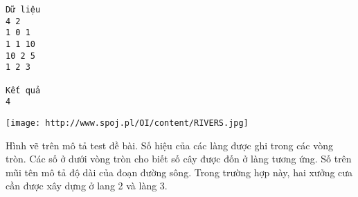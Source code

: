 \begin{verbatim}
Dữ liệu
4 2
1 0 1
1 1 10
10 2 5
1 2 3

Kết quả
4
\end{verbatim}
\texttt{[image: http://www.spoj.pl/OI/content/RIVERS.jpg]}

   Hình vẽ trên mô tả test đề bài. Số hiệu của các làng được ghi trong các vòng tròn. Các số ở dưới vòng tròn cho biết số cây được đốn ở làng tương ứng. Số trên mũi tên mô tả độ dài của đoạn đường sông. Trong trường hợp này, hai xưởng cưa cần được xây dựng ở lang 2 và làng 3.